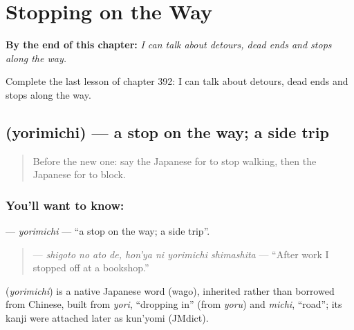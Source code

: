 
\chapter{Stopping on the Way}
\label{ch:ja-stopping-on-the-way}

\begin{chapteropening}
\textbf{By the end of this chapter:} \emph{I can talk about detours, dead ends and stops along the way.}

Complete the last lesson of chapter 392: I can talk about detours, dead ends and stops along the way.
\end{chapteropening}

\section[\texorpdfstring{\ja{よりみち} (yorimichi)}{よりみち (yorimichi)}]{ (yorimichi) — a stop on the way; a side trip}

\label{lesson:JA-C392-yorimichi}



\begin{quote}
Before the new one: say the Japanese for to stop walking, then the Japanese for to block.
\end{quote}

\subsection*{You'll want to know: }
\textbf{} — \emph{yorimichi} — \textquotedblleft{}a stop on the way; a side trip\textquotedblright{}.

\begin{quote}
\textbf{  } — \emph{shigoto no ato de, hon'ya ni yorimichi shimashita} — \textquotedblleft{}After work I stopped off at a bookshop.\textquotedblright{}
\end{quote}

\begin{cousinweb}
\textbf{} (\emph{yorimichi}) is a native Japanese word (wago), inherited rather than borrowed from Chinese, built from \emph{yori}, \textquotedblleft{}dropping in\textquotedblright{} (from \emph{yoru}) and \emph{michi}, \textquotedblleft{}road\textquotedblright{}; its kanji were attached later as kun'yomi (JMdict).
\end{cousinweb}

